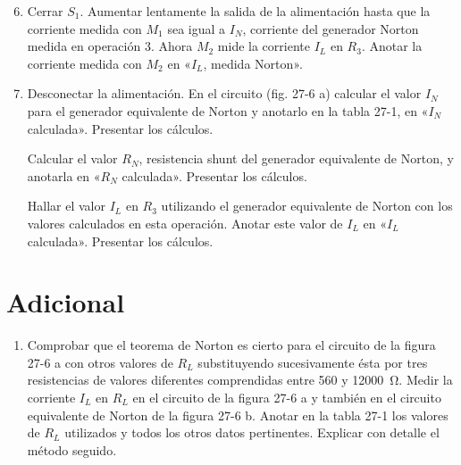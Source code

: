 \begin{enumerate}[resume, label=\arabic*.]
    \setcounter{enumi}{5} %
    \item Cerrar $S_1$. Aumentar lentamente la salida de la alimentación hasta que la corriente medida con $M_1$ sea igual a $I_N$, corriente del generador Norton medida en operación 3. Ahora $M_2$ mide la corriente $I_L$ en $R_3$. Anotar la corriente medida con $M_2$ en «$I_L$, medida Norton».

    \item Desconectar la alimentación. En el circuito (fig. 27-6 a) calcular el valor $I_N$ para el generador equivalente de Norton y anotarlo en la tabla 27-1, en «$I_N$ calculada». Presentar los cálculos.

    Calcular el valor $R_N$, resistencia shunt del generador equivalente de Norton, y anotarla en «$R_N$ calculada». Presentar los cálculos.

    Hallar el valor $I_L$ en $R_3$ utilizando el generador equivalente de Norton con los valores calculados en esta operación. Anotar este valor de $I_L$ en «$I_L$ calculada». Presentar los cálculos.
\end{enumerate}

\section{Adicional}
\begin{enumerate}[resume, label=\arabic*.]
    \item Comprobar que el teorema de Norton es cierto para el circuito de la figura 27-6 a con otros valores de $R_L$ substituyendo sucesivamente ésta por tres resistencias de valores diferentes comprendidas entre 560 y \SI{12000}{\ohm}. Medir la corriente $I_L$ en $R_L$ en el circuito de la figura 27-6 a y también en el circuito equivalente de Norton de la figura 27-6 b. Anotar en la tabla 27-1 los valores de $R_L$ utilizados y todos los otros datos pertinentes. Explicar con detalle el método seguido.
\end{enumerate}

